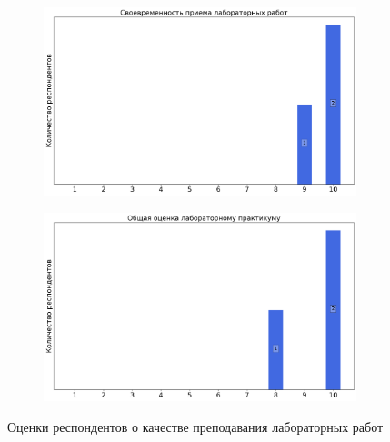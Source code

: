 \begin{figure}[H]
                \begin{subfigure}[b]{0.45\textwidth}
                    \centering
                    \includegraphics[width=\textwidth]{images/3 course/Общая физика - квантовая физика/labniks-marks-Гуденко С.В.-2.png}
                \end{subfigure}
                \begin{subfigure}[b]{0.45\textwidth}
                    \centering
                    \includegraphics[width=\textwidth]{images/3 course/Общая физика - квантовая физика/labniks-marks-Гуденко С.В.-3.png}
                \end{subfigure}	
                \caption{Оценки респондентов о качестве преподавания лабораторных работ}
            \end{figure}

        
